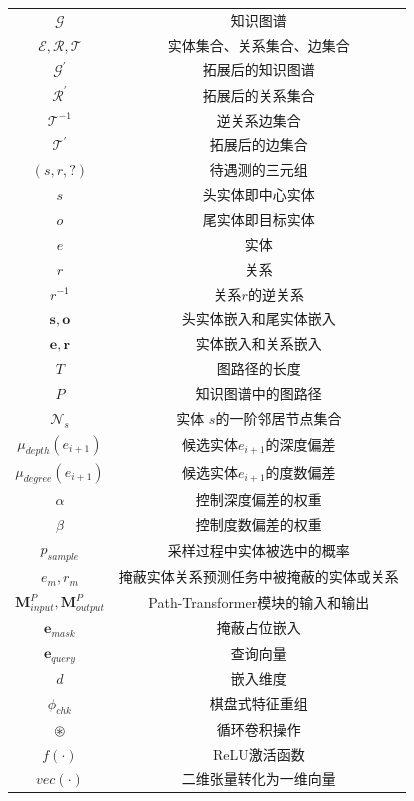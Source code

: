 \begin{longtable}[htbp]{cc}
  $\mathcal{G}$   &   知识图谱      \\
  $\mathcal{E}, \mathcal{R}, \mathcal{T}$   &   实体集合、关系集合、边集合      \\
  $\mathcal{G}^\prime$  &  拓展后的知识图谱      \\
  $\mathcal{R}^{\prime}$   &   拓展后的关系集合      \\
  $\mathcal{T}^{-1}$   &   逆关系边集合      \\
  $\mathcal{T}^{\prime}$   &   拓展后的边集合      \\
  $(s,r,?)$  &   待遇测的三元组      \\
  $s$   &   头实体即中心实体      \\
  $o$   &   尾实体即目标实体      \\
  $e$   &   实体      \\
  $r$   &   关系      \\
  $r^{-1}$   &   关系$r$的逆关系      \\
  $\boldsymbol{s},\boldsymbol{o}$ & 头实体嵌入和尾实体嵌入\\
  $\boldsymbol{e},\boldsymbol{r}$ & 实体嵌入和关系嵌入\\
  $T$ & 图路径的长度\\
  $P$ & 知识图谱中的图路径\\
  $\mathcal{N}_s$ & 实体 $s$的一阶邻居节点集合\\
  $\mu_{depth}(e_{i+1})$ & 候选实体$e_{i+1}$的深度偏差\\
  $\mu_{degree}(e_{i+1})$ & 候选实体$e_{i+1}$的度数偏差\\
  $\alpha$ & 控制深度偏差的权重\\
  $\beta$ & 控制度数偏差的权重\\
  $p_{sample}$ & 采样过程中实体被选中的概率\\
  $e_m,r_m$ & 掩蔽实体关系预测任务中被掩蔽的实体或关系\\
  $\mathbf{M}_{input}^{P},\mathbf{M}_{output}^{P}$ & Path-Transformer模块的输入和输出\\
  $\boldsymbol{e}_{mask}$ & 掩蔽占位嵌入\\
  $\boldsymbol{e}_{query}$ & 查询向量\\
  $d$ & 嵌入维度\\
  $\phi_{chk}$ & 棋盘式特征重组\\
  $\circledast$ & 循环卷积操作\\
  $f(\cdot )$ & ReLU激活函数\\
  $vec(\cdot)$ & 二维张量转化为一维向量\\

\end{longtable}
